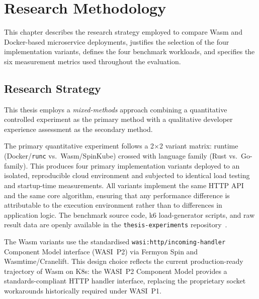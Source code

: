 \chapter{Research Methodology}
\label{chap:methodology}

This chapter describes the research strategy employed to compare \acs{Wasm} and Docker-based microservice deployments, justifies the selection of the four implementation variants, defines the four benchmark workloads, and specifies the six measurement metrics used throughout the evaluation.

\section{Research Strategy}
\label{sec:research_strategy}

This thesis employs a \textit{mixed-methods} approach combining a quantitative controlled experiment as the primary method with a qualitative developer experience assessment as the secondary method.

\begin{sloppypar}
The primary quantitative experiment follows a 2$\times$2 variant matrix: runtime (Docker/\texttt{runc} vs.\ \acs{Wasm}/SpinKube) crossed with language family (Rust vs.\ Go-family). This produces four primary implementation variants deployed to an isolated, reproducible cloud environment and subjected to identical load testing and startup-time measurements. All variants implement the same \acs{HTTP} \acs{API} and the same core algorithm, ensuring that any performance difference is attributable to the execution environment rather than to differences in application logic. The benchmark source code, k6 load-generator scripts, and raw result data are openly available in the \texttt{thesis-experiments} repository~\cite{musaev2026thesisexperiments}.
\end{sloppypar}

\begin{sloppypar}
The \acs{Wasm} variants use the standardised \texttt{wasi:http/incoming-handler} Component Model interface (\acs{WASI}~P2) via Fermyon Spin and Wasmtime/Cranelift. This design choice reflects the current production-ready trajectory of \acs{Wasm} on \acs{K8s}: the \acs{WASI}~P2 Component Model provides a standards-compliant \acs{HTTP} handler interface, replacing the proprietary socket workarounds historically required under \acs{WASI}~P1.
\end{sloppypar}

